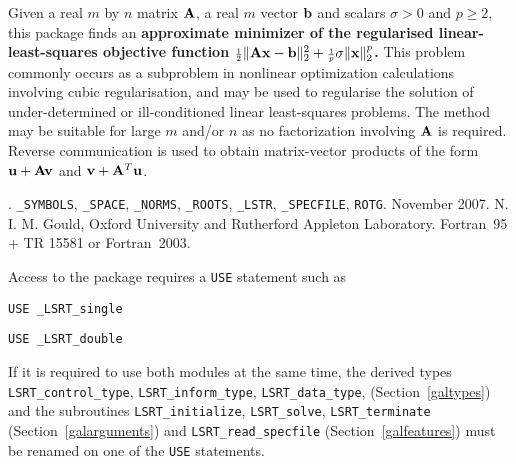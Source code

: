 \documentclass{galahad}
\newcommand{\packagename}{LS\-RT}
\newcommand{\fullpackagename}{\libraryname\_\packagename}
\begin{document}
\galheader


\galsummary
Given a real $m$ by $n$ matrix ${\mathbf{A}}$, a real $m$ vector ${\mathbf{b}}$ and 
scalars $\sigma>0$ and $p \geq 2$, this package finds an  
{\bf approximate minimizer of the regularised linear-least-squares 
objective function  
${\scriptstyle \frac{1}{2}}\| {\mathbf{A}} {\mathbf{x}} - {\mathbf{b}}\|_2^2 + {\scriptstyle \frac{1}{p}} \sigma \| {\mathbf{x}} \|_2^p$.}
This problem commonly occurs as a subproblem in nonlinear 
optimization calculations involving cubic regularisation,
and may be used to regularise the solution 
of under-determined or ill-conditioned linear least-squares problems.
The method may be suitable for large $m$ and/or $n$ as no factorization 
involving ${\mathbf{A}}$ is required. Reverse communication is used to obtain  
matrix-vector products of the form ${\mathbf{u}} + {\mathbf{A}} {\mathbf{v}}$ and
${\mathbf{v}} + {\mathbf{A}}^T {\mathbf{u}}$.


\galattributes
\galversions{\tt  \fullpackagename\_single, \fullpackagename\_double}.
\galuses 
{\tt \libraryname\_SY\-M\-BOLS}, 
{\tt \libraryname\_SPACE}, {\tt \libraryname\_\-NORMS}, 
{\tt \libraryname\_ROOTS}, {\tt \libraryname\_LSTR},
{\tt \libraryname\_SPECFILE},
{\tt *ROTG}.
\galdate November 2007.
\galorigin N. I. M. Gould, Oxford University and Rutherford Appleton Laboratory.
\gallanguage Fortran~95 + TR 15581 or Fortran~2003. 


\galhowto

Access to the package requires a {\tt USE} statement such as

\medskip{}

\hskip0.5in {\tt USE \fullpackagename\_single}

\medskip{}

\hskip0.5in {\tt USE  \fullpackagename\_double}

\medskip

\noindent
If it is required to use both modules at the same time, the derived types 
{\tt \packagename\_control\_type}, {\tt \packagename\_inform\_type}, 
{\tt \packagename\_data\_type},
(Section~\ref{galtypes})
and the subroutines
{\tt \packagename\_initialize},  
{\tt \packagename\_solve}, {\tt \packagename\_terminate}
(Section~\ref{galarguments})
and 
{\tt \packagename\_read\_specfile}
(Section~\ref{galfeatures})
must be renamed on one of the {\tt USE} statements.
\end{document}
